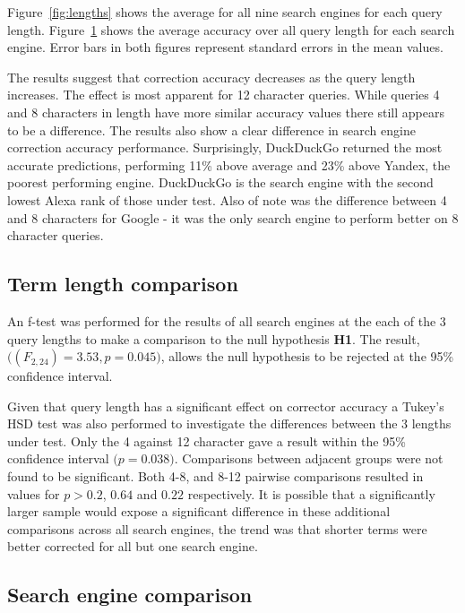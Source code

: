 \documentclass{csfourzero}
\begin{document}
\begin{figure}
\begin{minipage}{.5\textwidth}
    \label{fig:searchengines}
  \end{minipage}
\end{figure}

Figure~\ref{fig:lengths} shows the average for all nine search engines for each query length. Figure~\ref{fig:searchengines} shows the average accuracy over all query length for each search engine. Error bars in both figures represent standard errors in the mean values.

The results suggest that correction accuracy decreases as the query length increases. The effect is most apparent for 12 character queries. While queries 4 and 8 characters in length have more similar accuracy values there still appears to be a difference. The results also show a clear difference in search engine correction accuracy performance. Surprisingly, DuckDuckGo returned the most accurate predictions, performing 11\% above average and 23\% above Yandex, the poorest performing engine. DuckDuckGo is the search engine with the second lowest Alexa rank of those under test. Also of note was the difference between 4 and 8 characters for Google - it was the only search engine to perform better on 8 character queries.

\subsection{Term length comparison}
An f-test was performed for the results of all search engines at the each of the 3 query lengths to make a comparison to the null hypothesis \textbf{H1}. The result, $\big((F_{2,24}) = 3.53, p = 0.045\big)$, allows the null hypothesis to be rejected at the 95\% confidence interval.

Given that query length has a significant effect on corrector accuracy a Tukey's HSD test was also performed to investigate the differences between the 3 lengths under test. Only the 4 against 12 character gave a result within the 95\% confidence interval $\big(p = 0.038\big)$. Comparisons between adjacent groups were not found to be significant. Both 4-8, and 8-12 pairwise comparisons resulted in values for $p > 0.2$, $0.64$ and $0.22$ respectively. It is possible that a significantly larger sample would expose a significant difference in these additional comparisons across all search engines, the trend was that shorter terms were better corrected for all but one search engine.

\subsection{Search engine comparison}
\end{document}
